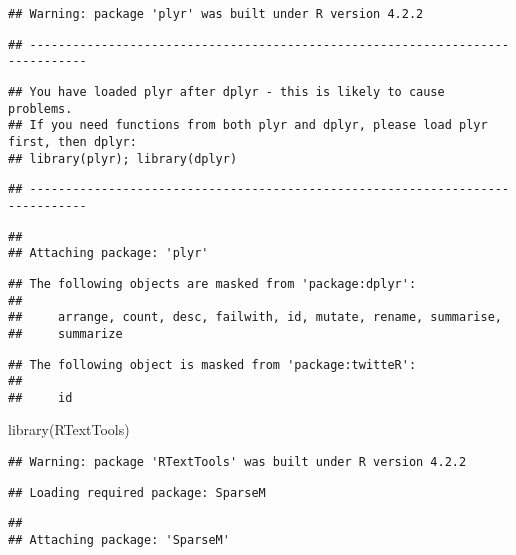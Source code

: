 \documentclass[
]{article}
\newenvironment{Shaded}{\begin{snugshade}}{\end{snugshade}}
\newcommand{\FunctionTok}[1]{\textcolor[rgb]{0.00,0.00,0.00}{#1}}
\newcommand{\NormalTok}[1]{#1}
\begin{document}
\begin{verbatim}
## Warning: package 'plyr' was built under R version 4.2.2
\end{verbatim}

\begin{verbatim}
## ------------------------------------------------------------------------------
\end{verbatim}

\begin{verbatim}
## You have loaded plyr after dplyr - this is likely to cause problems.
## If you need functions from both plyr and dplyr, please load plyr first, then dplyr:
## library(plyr); library(dplyr)
\end{verbatim}

\begin{verbatim}
## ------------------------------------------------------------------------------
\end{verbatim}

\begin{verbatim}
## 
## Attaching package: 'plyr'
\end{verbatim}

\begin{verbatim}
## The following objects are masked from 'package:dplyr':
## 
##     arrange, count, desc, failwith, id, mutate, rename, summarise,
##     summarize
\end{verbatim}

\begin{verbatim}
## The following object is masked from 'package:twitteR':
## 
##     id
\end{verbatim}

\begin{Shaded}
\begin{Highlighting}[]
\FunctionTok{library}\NormalTok{(RTextTools)}
\end{Highlighting}
\end{Shaded}

\begin{verbatim}
## Warning: package 'RTextTools' was built under R version 4.2.2
\end{verbatim}

\begin{verbatim}
## Loading required package: SparseM
\end{verbatim}

\begin{verbatim}
## 
## Attaching package: 'SparseM'
\end{verbatim}
\end{document}
